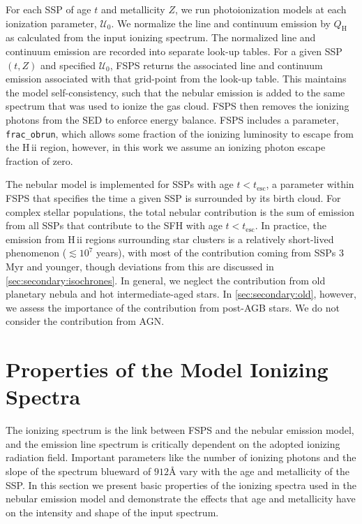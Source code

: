 \documentclass[trackchanges, twocolumn, tighten]{aastex61}
\newcommand{\Sec}[1]{\autoref{sec:#1}}
\newcommand{\FSPS}{{\sc FSPS}\xspace}
\newcommand{\hii}{H\,{\sc ii}\xspace}
\newcommand{\ang}{\ensuremath{\mbox{\AA}}}
\newcommand{\QH}{\ensuremath{Q_{\mathrm{H}}}}
\newcommand{\U}{\ensuremath{\mathcal{U}_{0}}}
\begin{document}
For each SSP of age $t$ and metallicity $Z$, we run photoionization models at each ionization parameter, \U{}. We normalize the line and continuum emission by \QH{} as calculated from the input ionizing spectrum. The normalized line and continuum emission are recorded into separate look-up tables. For a given SSP $(t, Z)$ and specified \U{}, \FSPS returns the associated line and continuum emission associated with that grid-point from the look-up table. This maintains the model self-consistency, such that the nebular emission is added to the same spectrum that was used to ionize the gas cloud. \FSPS then removes the ionizing photons from the SED to enforce energy balance. \FSPS includes a parameter, {\tt frac\_obrun}, which allows some fraction of the ionizing luminosity to escape from the \hii region, however, in this work we assume an ionizing photon escape fraction of zero.

The nebular model is implemented for SSPs with age $t < t_{\mathrm{esc}}$, a parameter within \FSPS that specifies the time a given SSP is surrounded by its birth cloud. For complex stellar populations, the total nebular contribution is the sum of emission from all SSPs that contribute to the SFH with age $t < t_{\mathrm{esc}}$. In practice, the emission from \hii regions surrounding star clusters is a relatively short-lived phenomenon ($\lesssim 10^7$ years), with most of the contribution coming from SSPs 3 Myr and younger, though deviations from this are discussed in \Sec{secondary:isochrones}. In general, we neglect the contribution from old planetary nebula and hot intermediate-aged stars. In \Sec{secondary:old}, however, we assess the importance of the contribution from post-AGB stars. We do not consider the contribution from AGN.

\section{Properties of the Model Ionizing Spectra}\label{sec:spectra}

The ionizing spectrum is the link between \FSPS and the nebular emission model, and the emission line spectrum is critically dependent on the adopted ionizing radiation field. Important parameters like the number of ionizing photons and the slope of the spectrum blueward of $912\ang$ vary with the age and metallicity of the SSP. In this section we present basic properties of the ionizing spectra used in the nebular emission model and demonstrate the effects that age and metallicity have on the intensity and shape of the input spectrum.
\end{document}
